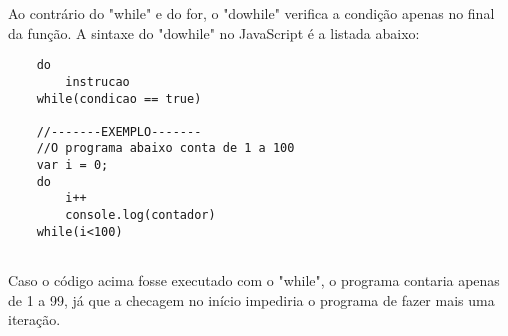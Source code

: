 	Ao contrário do "while" e do for, o "dowhile" verifica a condição apenas no final da função. A sintaxe do "dowhile" no JavaScript é a listada abaixo:
	\newline
	\begin{lstlisting}
	do
		instrucao
	while(condicao == true)
	
	//-------EXEMPLO-------
	//O programa abaixo conta de 1 a 100
	var i = 0;
	do
		i++
		console.log(contador)
	while(i<100)
	
	\end{lstlisting}
	
	Caso o código acima fosse executado com o "while", o programa contaria apenas de 1 a 99, já que a checagem no início impediria o programa de fazer mais uma iteração.
	
	 
	




